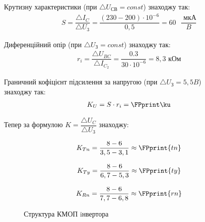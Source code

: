 \documentclass[a4paper,14pt]{extreport}
\begin{document}
\newpage

\FPeval{}

 Крутизну характеристики (при $\triangle U_{\text{СВ}} = const$) знаходжу так:
\begin{align*}
  S  = \dfrac{\triangle I_C}{\triangle U_{\text{3}} }= \dfrac{(230-200)\cdot10^{-6}}{0,5} = 60  \text{ } \dfrac{\text{ мкА}}{B}
\end{align*}

Диференційний опір (при $\triangle U_{\text{З}} = const$) знаходжу так:
\FPeval{}
\begin{align*}
  r_i = \dfrac{\triangle U_{BC}}{\triangle I_{C_2}}= \dfrac{0.3}{30\cdot 10^{-6}} = 8,3 \text{ кОм}
\end{align*}

Граничний кофіцієнт підсилення за напругою (при $\triangle U_{\text{З}} = 5,5 B$) \\ знаходжу так:
\FPeval{}
\begin{align*}
  K_U = S\cdot r_i  = \FPprint\ku
\end{align*}











Тепер за формулою $K = \dfrac{\triangle U_C}{\triangle U_3}$ знаходжу:\\


\FPeval{}

\FPeval{}
\begin{align*}
  K_{Tn} = \dfrac{8-6}{3,5-3,1} \approx \FPprint{tn}
\end{align*}


\FPeval{}
\begin{align*}
  K_{Ty} = \dfrac{8-6}{6,7-5,3} \approx \FPprint{ty}
\end{align*}


\FPeval{}
\begin{align*}
  K_{Rn} = \dfrac{8-6}{7,7-6,8} \approx \FPprint{rn}
\end{align*}



\newpage
\begin{figure}[h]
\caption{Структура КМОП iнвертора}
\end{figure}
\end{document}
